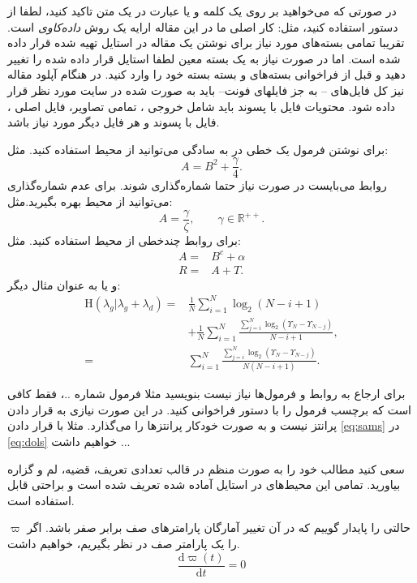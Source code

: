 \documentclass{CCI2020}
\begin{document}
در صورتی که می‌خواهید بر روی یک کلمه و یا عبارت در یک متن تاکید کنید، لطفا از دستور
 استفاده کنید، مثل: کار اصلی ما در این مقاله ارایه یک روش
\emph{داده‌کاوی}
است. تقریبا تمامی بسته‌های مورد نیاز برای نوشتن یک مقاله در استایل 
\lr{\LaTeX}
 تهیه شده قرار داده شده است. اما در صورت نیاز به یک بسته معین لطفا استایل قرار داده شده را تغییر دهید و قبل از فراخوانی بسته‌های
 و بسته 
\lr{\XePersian} 
 بسته خود را وارد کنید. در هنگام آپلود مقاله نیز کل فایل‌های 
\lr{\LaTeX} 
 -- به جز فایلهای فونت-- باید به صورت
 شده در سایت مورد نظر قرار داده شود. محتویات فایل با پسوند
 باید شامل خروجی 
،
 تمامی تصاویر، فایل اصلی 
، 
 فایل با پسوند
 و هر فایل دیگر مورد نیاز باشد.

برای نوشتن فرمول یک خطی در
 \lr{\LaTeX}
  به سادگی می‌توانید از محیط 
   استفاده کنید. مثل:
\begin{equation}
A = B^2 + \frac{\gamma}{4}.
\label{eq:dols}
\end{equation}
روابط می‌بایست در صورت نیاز حتما شماره‌گذاری شوند. برای عدم شماره‌گذاری می‌توانید از محیط 
 بهره بگیرید.مثل:
\begin{equation*}
A = \frac{\gamma}{\zeta}, \quad\quad \gamma\in\mathbb{R}^{++}.
\end{equation*}
برای روابط چندخطی از محیط
  استفاده کنید. مثل:
\begin{align}
A =& B^c+\alpha \nonumber\\
R =& A + T.
\label{eq:sams}
\end{align}
و یا به عنوان مثال دیگر:
\begin{align}
\mathrm{H}(\lambda_{g}|\lambda_{g}+\lambda_{d})  =& \frac{1}{N}\sum_{i=1}^{N}\log_{2}(N-i+1) \nonumber\\
&+  \frac{1}{N}\sum_{i=1}^{N}\frac{\sum_{j=i}^{N}\log_{2}(\Upsilon_{N}-\Upsilon_{N-j})}{N-i+1}, \nonumber\\
=& \sum_{i=1}^{N}\frac{\sum_{j=i}^{N}\log_{2}(\Upsilon_{N}-\Upsilon_{N-j})}{N(N-i+1)}.
\label{eq:conditionalentorpyresult}
\end{align}


برای ارجاع به روابط و فرمول‌ها نیاز نیست بنویسید مثلا فرمول شماره ..، فقط کافی است که برچسب فرمول را با دستور
  فراخوانی کنید. در این صورت نیازی به قرار دادن پرانتز نیست و
   \lr{\LaTeX}
    به صورت خودکار پرانتزها را می‌گذارد. مثلا با قرار دادن
     \eqref{eq:sams}
      در 
      \eqref{eq:dols}
       خواهیم داشت ... 

سعی کنید مطالب خود را به صورت منظم در قالب تعدادی تعریف، قضیه، لم و گزاره بیاورید. تمامی این محیط‌های در استایل آماده شده تعریف شده است و براحتی قابل استفاده است.
\begin{definition}
حالتی را پایدار گوییم که در آن تغییر آمارگان پارامترهای صف برابر صفر باشد. اگر $\varpi$ را یک پارامتر صف در نظر بگیریم، خواهیم داشت.
\begin{equation}
\frac{\mathrm{d}\varpi(t)}{\mathrm{d}t}=0
\end{equation}
\end{definition}
\end{document}
